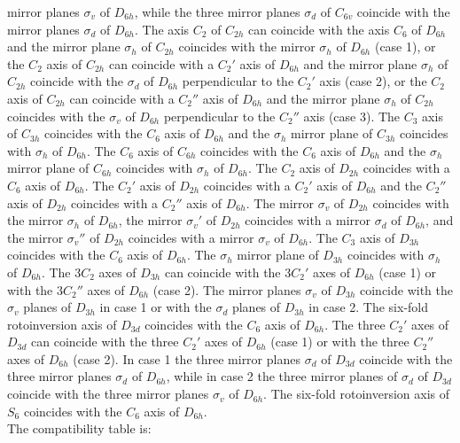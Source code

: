 \documentclass[12pt,a4paper]{article}
\begin{document}
mirror planes $\sigma_v$ of $D_{6h}$, while the three mirror planes
$\sigma_d$ of $C_{6v}$ coincide with the mirror planes $\sigma_d$ of 
$D_{6h}$. The axis $C_2$ of $C_{2h}$ can coincide with the axis $C_6$
of $D_{6h}$ and the mirror plane $\sigma_h$ of $C_{2h}$ coincides with
the mirror $\sigma_h$ of $D_{6h}$ (case 1), or the $C_2$ axis of 
$C_{2h}$ can coincide with a $C_2'$ axis of $D_{6h}$ and the mirror
plane $\sigma_h$ of $C_{2h}$ coincide with the $\sigma_d$ of $D_{6h}$
perpendicular to the $C_2'$ axis (case 2), or the $C_2$ axis of
$C_{2h}$ can coincide with a $C_2''$ axis of $D_{6h}$ and the
mirror plane $\sigma_h$ of $C_{2h}$ coincides with the $\sigma_v$ of $D_{6h}$ 
perpendicular to the $C_2''$ axis (case 3). The $C_3$ axis of $C_{3h}$
coincides with the $C_6$ axis of $D_{6h}$ and the $\sigma_h$ mirror plane
of $C_{3h}$ coincides with $\sigma_h$ of $D_{6h}$.
The $C_6$ axis of $C_{6h}$ coincides with the $C_6$ axis of $D_{6h}$ 
and the $\sigma_h$ mirror plane
of $C_{6h}$ coincides with $\sigma_h$ of $D_{6h}$.
The $C_2$ axis of $D_{2h}$ coincides with a $C_6$ axis of $D_{6h}$. The $C_2'$ 
axis of $D_{2h}$ coincides with a $C_2'$ axis of $D_{6h}$ and the $C_2''$ axis of 
$D_{2h}$ coincides with a $C_2''$ axis of $D_{6h}$. The mirror $\sigma_v$ of 
$D_{2h}$ coincides with the mirror $\sigma_h$ of $D_{6h}$, the mirror $\sigma_v'$ 
of $D_{2h}$ coincides with a mirror $\sigma_d$ of $D_{6h}$, and the mirror
$\sigma_v''$ of $D_{2h}$ coincides with a mirror $\sigma_v$ of $D_{6h}$. 
The $C_3$ axis of $D_{3h}$ coincides with the $C_6$ axis of $D_{6h}$.
The $\sigma_h$ mirror plane of $D_{3h}$ coincides with $\sigma_h$ 
of $D_{6h}$. The $3C_2$ axes of $D_{3h}$ can coincide with the
$3C_2'$ axes of $D_{6h}$ (case 1) or with the $3C_2''$ axes of $D_{6h}$ 
(case 2). The mirror planes $\sigma_v$ of $D_{3h}$ coincide with the 
$\sigma_v$ planes of $D_{3h}$ in case 1 or with the $\sigma_d$ planes of 
$D_{3h}$ in case 2. The six-fold rotoinversion axis of $D_{3d}$ coincides with the 
$C_6$ axis of $D_{6h}$. The three $C_2'$ axes of $D_{3d}$ can coincide
with the three $C_2'$ axes of $D_{6h}$ (case 1) or with the three $C_2''$ 
axes of $D_{6h}$ (case 2). In case 1 the three mirror planes $\sigma_d$
of $D_{3d}$ coincide with the three mirror planes $\sigma_d$ of $D_{6h}$, 
while in case 2 the three mirror planes of $\sigma_d$
of $D_{3d}$ coincide with the three mirror planes $\sigma_v$ of $D_{6h}$.
The six-fold rotoinversion axis of $S_6$ coincides with the $C_6$ axis of $D_{6h}$.
\\
The compatibility table is:
\end{document}
